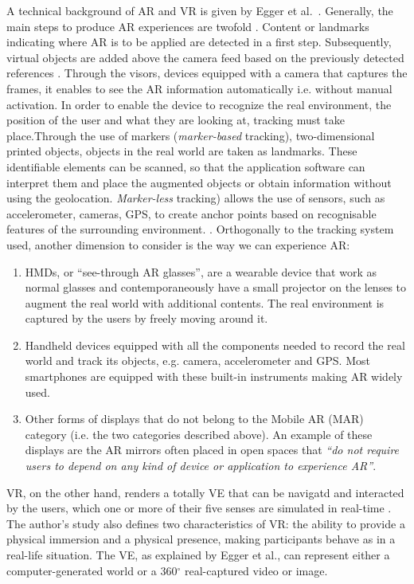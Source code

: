 A technical background of AR and VR is given by Egger et al.~\cite{egger_augmented_2020}. Generally, the main steps to produce AR experiences are twofold \cite{jenny_enhancing_2017}.
Content or landmarks indicating where AR is to be applied are detected in a first step. Subsequently, virtual objects are added above the camera feed based on the previously detected references \cite{parker_jr_augmented_2014}. Through the visors, devices equipped with a camera that captures the frames, it enables to see the AR information automatically i.e. without manual activation. In order to enable the device to recognize the real environment, the position of the user and what they are looking at, tracking must take place.Through the use of markers (\emph{marker-based} tracking), two-dimensional printed objects, objects in the real world are taken as landmarks. These identifiable elements can be scanned, so that the application software can interpret them and place the augmented objects or obtain information without using the geolocation. \emph{Marker-less} tracking) allows the use of sensors, such as accelerometer, cameras, GPS, to create anchor points based on recognisable features of the surrounding environment. \cite{egger_augmented_2020}.
Orthogonally to the tracking system used, another dimension to consider is the way we can experience AR:
\begin{enumerate}
	\item \glspl{HMD}, or “see-through AR glasses”, are a wearable device that work as normal glasses and contemporaneously have a small projector on the lenses to augment the real world with additional contents. The real environment is captured by the users by freely moving around it.
	\item Handheld devices equipped with all the components needed to record the real world and track its objects, e.g. camera, accelerometer and GPS. Most smartphones are equipped with these built-in instruments making AR widely used.
	\item Other forms of displays that do not belong to the Mobile AR (MAR) category (i.e. the two categories described above). An example of these displays are the AR mirrors often placed in open spaces that \textit{“do not require users to depend on any kind of device or application to experience AR”}.
\end{enumerate} 
VR, on the other hand, renders a totally VE that can be navigatd and interacted by the users, which one or more of their five senses are simulated in real-time \cite{guttentag_virtual_2020}. The author's study also defines two characteristics of VR: the ability to provide a physical immersion and a physical presence, making participants behave as in a real-life situation.
The VE, as explained by Egger et al., can represent either a computer-generated world or a 360$^{\circ}$ real-captured video or image.

